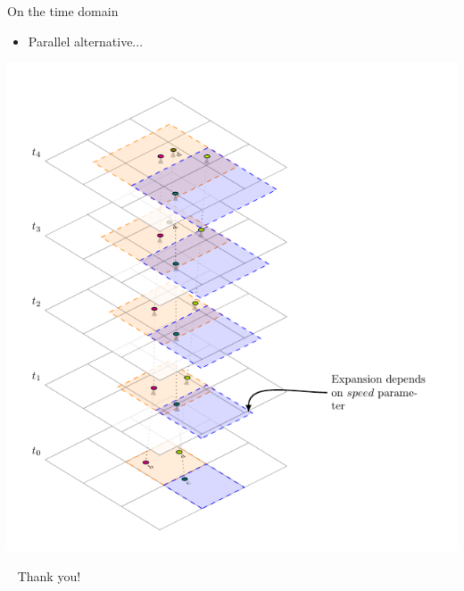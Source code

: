 \documentclass{beamer}
\begin{document}
    \begin{frame}{On the time domain}
        \begin{itemize} \item Parallel alternative... \end{itemize} \vspace{0.25cm}

        \centering
        \includegraphics[height=0.8\textheight]{figures/TemporalPartitioning}
    \end{frame}

    \begin{frame}{ \ }
        \LARGE Thank you!
    \end{frame}
\end{document}
